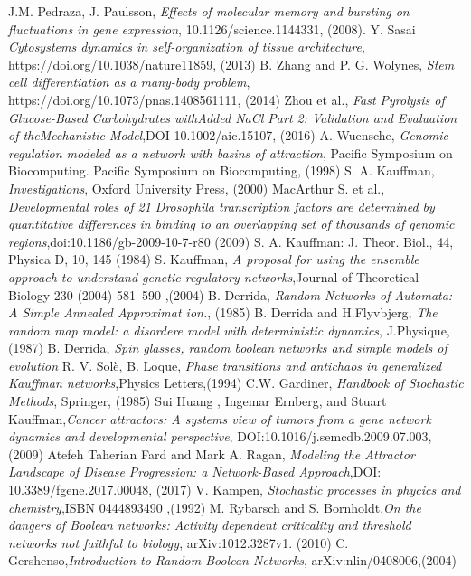\begin{thebibliography}{90}
 J.M. Pedraza, J. Paulsson, \emph{Effects of molecular memory and bursting on fluctuations in gene expression}, 10.1126/science.1144331, (2008).
 Y. Sasai \emph{Cytosystems dynamics in self-organization of tissue architecture}, https://doi.org/10.1038/nature11859, (2013)
 B. Zhang and P. G. Wolynes, \emph{Stem cell differentiation as a many-body problem}, https://doi.org/10.1073/pnas.1408561111, (2014)
 Zhou et al., \emph{Fast Pyrolysis of Glucose-Based Carbohydrates withAdded NaCl Part 2: Validation and Evaluation of theMechanistic Model},DOI 10.1002/aic.15107, (2016)
 A. Wuensche, \emph{Genomic regulation modeled as a network with basins of attraction}, Pacific Symposium on Biocomputing. Pacific Symposium on Biocomputing, (1998)
 S. A. Kauffman, \emph{Investigations}, Oxford University
Press, (2000)
 MacArthur S. et al., \emph{Developmental roles of 21 Drosophila transcription factors are determined by quantitative differences in binding to an overlapping set of thousands of genomic regions},doi:10.1186/gb-2009-10-7-r80 (2009)
 S. A. Kauffman: J. Theor. Biol., 44, Physica D, 10, 145 (1984)
 S. Kauffman, \emph{A proposal for using the ensemble approach to understand
genetic regulatory networks},Journal of Theoretical Biology 230 (2004) 581–590 ,(2004)
 B. Derrida, \emph{Random Networks of Automata: A Simple Annealed
Approximat ion.}, (1985)
 B. Derrida and H.Flyvbjerg, \emph{The random map model: a disordere model with deterministic dynamics}, J.Physique, (1987)
 B. Derrida, \emph{Spin glasses, random boolean networks and simple models of evolution}
 R. V. Solè, B. Loque, \emph{Phase transitions and antichaos in generalized Kauffman networks},Physics Letters,(1994)
 C.W. Gardiner, \emph{Handbook of Stochastic Methods}, Springer, (1985)
 Sui Huang , Ingemar Ernberg, and Stuart Kauffman,\emph{Cancer attractors: A systems view of tumors from a gene network
dynamics and developmental perspective}, DOI:10.1016/j.semcdb.2009.07.003, (2009)
 Atefeh Taherian Fard and Mark A. Ragan, \emph{Modeling the Attractor Landscape of
Disease Progression: a
Network-Based Approach},DOI: 10.3389/fgene.2017.00048, (2017)
 V. Kampen, \emph{Stochastic processes in phycics and chemistry},ISBN 0444893490 ,(1992)
 M. Rybarsch and S. Bornholdt,\emph{On the dangers of Boolean networks:
Activity dependent criticality and threshold networks not faithful to biology}, arXiv:1012.3287v1. (2010)
 C. Gershenso,\emph{Introduction to Random Boolean Networks}, arXiv:nlin/0408006,(2004)













\end{thebibliography}
